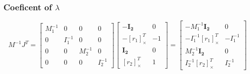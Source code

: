 \documentclass{article}
\begin{document}
	\subsubsection{Coeficent of $\lambda$}
		$$
			M^{-1}J^T=	
				\begin{bmatrix}
					M_1^{-1} 	& 0 		& 0 		& 0\\
					0 			& I_1^{-1} 	& 0 		& 0\\
					0 			& 0 		& M_2^{-1} 	& 0\\
					0 			& 0 		& 0 		& I_2^{-1}
				\end{bmatrix}
				\begin{bmatrix}
					-\boldsymbol{I_2} & 0\\
					-[r_1]_\times^T & -1\\
					\boldsymbol{I_2} & 0\\
					[r_2]_\times^T & 1
				\end{bmatrix}
				=
				\begin{bmatrix}
					-M_1^{-1}\boldsymbol{I_2} & 0\\
					-I_1^{-1}[r_1]_\times^T & -I_1^{-1}\\
					M_2^{-1}\boldsymbol{I_2} & 0\\
					I_2^{-1}[r_2]_\times^T & I_2^{-1}
				\end{bmatrix}
		$$
\end{document}

